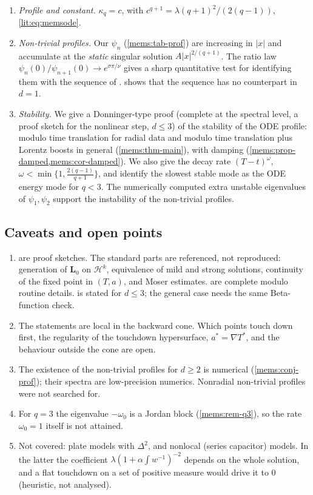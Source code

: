 \begin{enumerate}[label=(\alph*),nosep]
\item \emph{Profile and constant.} $\kappa_q=c$, with
$c^{q+1}=\lambda(q+1)^2/(2(q-1))$, \eqref{lit:eq:memsode}.
\item \emph{Non-trivial profiles.} Our $\psi_n$
(\cref{mems:tab-prof}) are increasing in $|x|$ and accumulate at the
\emph{static} singular solution $A|x|^{2/(q+1)}$. The ratio law
$\psi_n(0)/\psi_{n+1}(0)\to e^{\sigma\pi/\nu}$ gives a sharp quantitative test for
identifying them with the sequence of \cite{GimperleinHeLacey2022}.
 shows that the sequence has no counterpart in $d=1$.
\item \emph{Stability.} We give a Donninger-type proof (complete at the
spectral level, a proof sketch for the nonlinear step, $d\le3$) of the
stability of the ODE profile:
modulo time translation for radial data and modulo time translation plus
Lorentz boosts in general (\cref{mems:thm-main}), with damping
(\cref{mems:prop-damped,mems:cor-damped}). We also give the decay rate
$(T-t)^{\omega}$, $\omega<\min\{1,\frac{2(q-1)}{q+1}\}$, and identify the slowest
stable mode as the ODE energy mode for $q<3$. The numerically computed extra
unstable eigenvalues of $\psi_1,\psi_2$ support the instability of the
non-trivial profiles.
\end{enumerate}

\subsection{Caveats and open points}
\label{mems:sec-gaps}
\begin{enumerate}[nosep]
\item {} are proof sketches.
The standard parts are referenced, not reproduced: generation of
$\mathbf L_0$ on $\mathcal H^k$, equivalence of mild and strong solutions,
continuity of the fixed point in $(T,a)$, and Moser estimates.
 are complete modulo
routine details.  is stated for $d\le3$; the general
case needs the same Beta-function check.
\item The statements are local in the backward cone. Which points touch down
first, the regularity of the touchdown hypersurface, $a^*=\nabla T^*$, and
the behaviour outside the cone are open.
\item The existence of the non-trivial profiles for $d\ge2$ is numerical
(\cref{mems:conj-prof}); their spectra are low-precision numerics.
Nonradial non-trivial profiles were not searched for.
\item For $q=3$ the eigenvalue $-\omega_0$ is a Jordan block
(\cref{mems:rem-q3}), so the rate $\omega_0=1$ itself is not attained.
\item Not covered: plate models with $\Delta^2$, and nonlocal (series
capacitor) models. In the latter the coefficient
$\lambda(1+\alpha\int w^{-1})^{-2}$ depends on the whole solution, and a flat
touchdown on a set of positive measure would drive it to $0$ (heuristic, not
analysed).
\end{enumerate}
